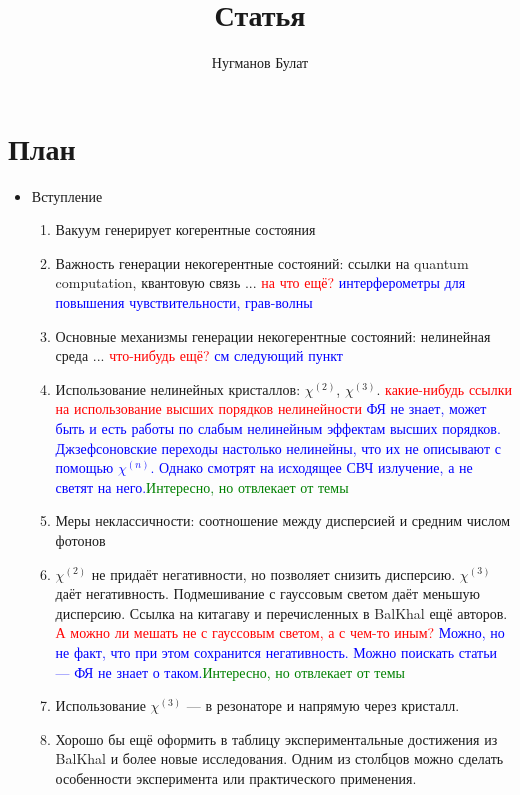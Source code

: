 \documentclass[a4paper, 12pt]{article}
\author{Нугманов Булат}
\title{Статья}
\begin{document}
\maketitle
\section*{План}
\begin{itemize}
    \item Вступление 
    \begin{enumerate}
        \item Вакуум генерирует когерентные состояния
        \item Важность генерации некогерентные состояний: ссылки на quantum computation, квантовую связь ... \textcolor{red}{на что ещё?} \textcolor{blue}{интерферометры для повышения чувствительности, грав-волны}
        \item Основные механизмы генерации некогерентные состояний: нелинейная среда ... \textcolor{red}{что-нибудь ещё?} \textcolor{blue}{см следующий пункт} 
        \item Использование нелинейных кристаллов: $\chi^{(2)}$, $\chi^{(3)}$. \textcolor{red}{какие-нибудь ссылки на использование высших порядков нелинейности} \textcolor{blue}{ФЯ не знает, может быть и есть работы по слабым нелинейным эффектам высших порядков. Джзефсоновские переходы настолько нелинейны, что их не описывают с помощью $\chi^{(n)}$. Однако смотрят на исходящее СВЧ излучение, а не светят на него.}\textcolor{green}{Интересно, но отвлекает от темы}
        \item Меры неклассичности: соотношение между дисперсией и средним числом фотонов
        \item $\chi^{(2)}$ не придаёт негативности, но позволяет снизить дисперсию. $\chi^{(3)}$ даёт негативность. Подмешивание с гауссовым светом даёт меньшую дисперсию.  Ссылка на китагаву и перечисленных в BalKhal ещё авторов. \textcolor{red}{А можно ли мешать не с гауссовым светом, а с чем-то иным?} \textcolor{blue}{Можно, но не факт, что при этом сохранится негативность. Можно поискать статьи --- ФЯ не знает о таком.}\textcolor{green}{Интересно, но отвлекает от темы}
        \item Использование $\chi^{(3)}$ --- в резонаторе и напрямую через кристалл. 
        \item Хорошо бы ещё оформить в таблицу экспериментальные достижения из BalKhal и более новые исследования. Одним из столбцов можно сделать особенности эксперимента или практического применения.
    \end{enumerate}

\end{itemize}
\end{document}

